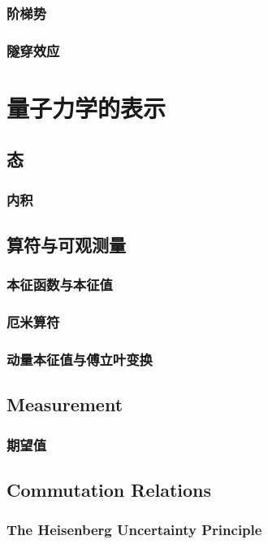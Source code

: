\documentclass{book}
\begin{document}
\subsection{阶梯势}%
\subsection{隧穿效应}%
\chapter{量子力学的表示}%
\section{态}%
\subsection{内积}%
\section{算符与可观测量}%
\subsection{本征函数与本征值}%
\subsection{厄米算符}%
\subsection{动量本征值与傅立叶变换}%
\section{Measurement}%
\subsection{期望值}%
\section{Commutation Relations}%
\subsection{The Heisenberg Uncertainty Principle}
\end{document}
